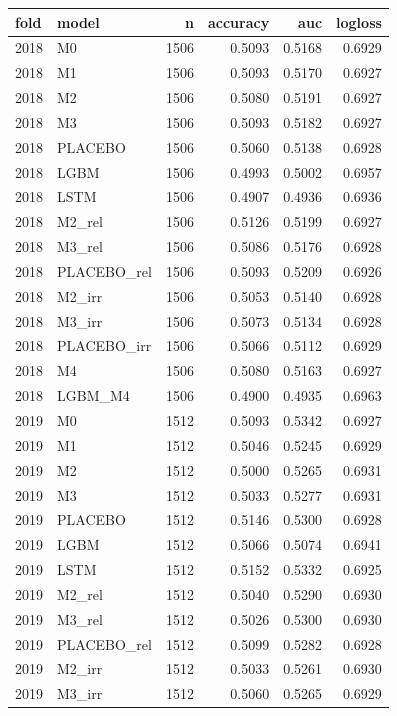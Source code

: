 \begin{tabular}{llrrrr}
\toprule
fold & model & n & accuracy & auc & logloss \\
\midrule
2018 & M0 & 1506 & 0.5093 & 0.5168 & 0.6929 \\
2018 & M1 & 1506 & 0.5093 & 0.5170 & 0.6927 \\
2018 & M2 & 1506 & 0.5080 & 0.5191 & 0.6927 \\
2018 & M3 & 1506 & 0.5093 & 0.5182 & 0.6927 \\
2018 & PLACEBO & 1506 & 0.5060 & 0.5138 & 0.6928 \\
2018 & LGBM & 1506 & 0.4993 & 0.5002 & 0.6957 \\
2018 & LSTM & 1506 & 0.4907 & 0.4936 & 0.6936 \\
2018 & M2\_rel & 1506 & 0.5126 & 0.5199 & 0.6927 \\
2018 & M3\_rel & 1506 & 0.5086 & 0.5176 & 0.6928 \\
2018 & PLACEBO\_rel & 1506 & 0.5093 & 0.5209 & 0.6926 \\
2018 & M2\_irr & 1506 & 0.5053 & 0.5140 & 0.6928 \\
2018 & M3\_irr & 1506 & 0.5073 & 0.5134 & 0.6928 \\
2018 & PLACEBO\_irr & 1506 & 0.5066 & 0.5112 & 0.6929 \\
2018 & M4 & 1506 & 0.5080 & 0.5163 & 0.6927 \\
2018 & LGBM\_M4 & 1506 & 0.4900 & 0.4935 & 0.6963 \\
2019 & M0 & 1512 & 0.5093 & 0.5342 & 0.6927 \\
2019 & M1 & 1512 & 0.5046 & 0.5245 & 0.6929 \\
2019 & M2 & 1512 & 0.5000 & 0.5265 & 0.6931 \\
2019 & M3 & 1512 & 0.5033 & 0.5277 & 0.6931 \\
2019 & PLACEBO & 1512 & 0.5146 & 0.5300 & 0.6928 \\
2019 & LGBM & 1512 & 0.5066 & 0.5074 & 0.6941 \\
2019 & LSTM & 1512 & 0.5152 & 0.5332 & 0.6925 \\
2019 & M2\_rel & 1512 & 0.5040 & 0.5290 & 0.6930 \\
2019 & M3\_rel & 1512 & 0.5026 & 0.5300 & 0.6930 \\
2019 & PLACEBO\_rel & 1512 & 0.5099 & 0.5282 & 0.6928 \\
2019 & M2\_irr & 1512 & 0.5033 & 0.5261 & 0.6930 \\
2019 & M3\_irr & 1512 & 0.5060 & 0.5265 & 0.6929 \\

\end{tabular}
